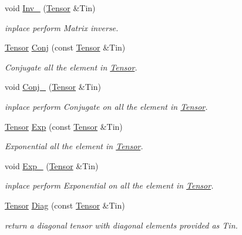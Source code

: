 \begin{DoxyCompactItemize}
void \hyperlink{namespacecytnx_1_1linalg_a26628db51e90867ddc050ab11a317a8d}{Inv\+\_\+} (\hyperlink{classcytnx_1_1Tensor}{Tensor} \&Tin)
\begin{DoxyCompactList}\small\item\em inplace perform Matrix inverse. \end{DoxyCompactList}\item 
\hyperlink{classcytnx_1_1Tensor}{Tensor} \hyperlink{namespacecytnx_1_1linalg_a470d0886432554a35ecaf961451c0806}{Conj} (const \hyperlink{classcytnx_1_1Tensor}{Tensor} \&Tin)
\begin{DoxyCompactList}\small\item\em Conjugate all the element in \hyperlink{classcytnx_1_1Tensor}{Tensor}. \end{DoxyCompactList}\item 
void \hyperlink{namespacecytnx_1_1linalg_adc3233bf8bc3eb6a435340f912412801}{Conj\+\_\+} (\hyperlink{classcytnx_1_1Tensor}{Tensor} \&Tin)
\begin{DoxyCompactList}\small\item\em inplace perform Conjugate on all the element in \hyperlink{classcytnx_1_1Tensor}{Tensor}. \end{DoxyCompactList}\item 
\hyperlink{classcytnx_1_1Tensor}{Tensor} \hyperlink{namespacecytnx_1_1linalg_aac38382cbc0e8202411c96a0ff636471}{Exp} (const \hyperlink{classcytnx_1_1Tensor}{Tensor} \&Tin)
\begin{DoxyCompactList}\small\item\em Exponential all the element in \hyperlink{classcytnx_1_1Tensor}{Tensor}. \end{DoxyCompactList}\item 
void \hyperlink{namespacecytnx_1_1linalg_aaab08439dde94ee87939d07933ede6e3}{Exp\+\_\+} (\hyperlink{classcytnx_1_1Tensor}{Tensor} \&Tin)
\begin{DoxyCompactList}\small\item\em inplace perform Exponential on all the element in \hyperlink{classcytnx_1_1Tensor}{Tensor}. \end{DoxyCompactList}\item 
\hyperlink{classcytnx_1_1Tensor}{Tensor} \hyperlink{namespacecytnx_1_1linalg_a5913f0bdd6cc130aeb927f42a874a149}{Diag} (const \hyperlink{classcytnx_1_1Tensor}{Tensor} \&Tin)
\begin{DoxyCompactList}\small\item\em return a diagonal tensor with diagonal elements provided as Tin. \end{DoxyCompactList}\item 

\end{DoxyCompactItemize}
